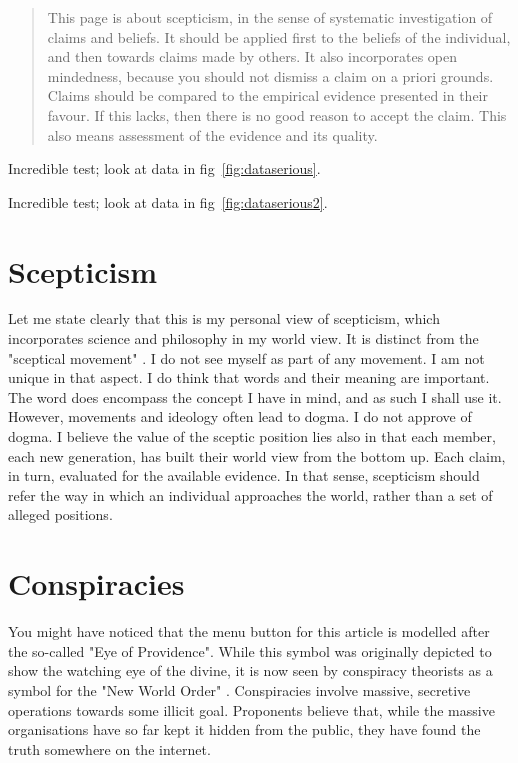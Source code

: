 \begin{abstract}
This page is about scepticism, in the sense of systematic investigation of claims and beliefs. It should be applied first to the beliefs
of the individual, and then towards claims made by others. It also incorporates open mindedness, because you should not dismiss a claim
on a priori grounds. Claims should be compared to the empirical evidence presented in their favour. If this lacks, then there is no good
reason to accept the claim. This also means assessment of the evidence and its quality.
\end{abstract}
\begin{multicols}{2}


Incredible test; look at data in fig~\ref{fig:dataserious}.


Incredible test; look at data in fig~\ref{fig:dataserious2}.
\section{Scepticism}

Let me state clearly that this is my personal view of scepticism, which incorporates science and philosophy in my world view. It is distinct
from the "sceptical movement" \cite{wikism}. I do not see myself as 
part of any movement. I am not unique in that aspect. I do think that words and their meaning are important. The word does encompass the
concept I have in mind, and as such I shall use it. However, movements and ideology often lead to dogma. I do not approve of dogma. I believe
the value of the sceptic position lies also in that each member, each new generation, has built their world view from the bottom up. Each claim,
in turn, evaluated for the available evidence. In that sense, scepticism should refer the way in which an individual approaches the world, rather
than a set of alleged positions.

\section{Conspiracies}

You might have noticed that the menu button for this article is modelled after the so-called "Eye of Providence". While this symbol was originally
depicted to show the watching eye of the divine, it is now seen by conspiracy theorists as a symbol for the "New World Order" \cite{wikinwo}.
Conspiracies involve massive, secretive operations towards some illicit goal. Proponents believe that, while the massive
organisations have so far kept it hidden from the public, they have found the truth somewhere on the internet.



\end{multicols}
